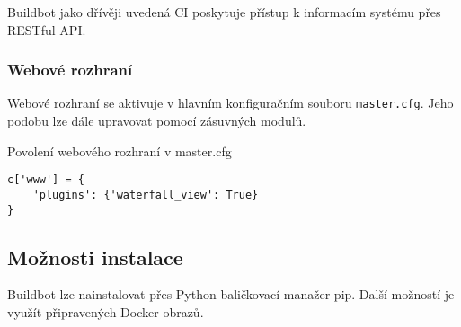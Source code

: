 Buildbot jako dřívěji uvedená CI poskytuje přístup k informacím systému přes RESTful API.

\subsubsection{Webové rozhraní}

Webové rozhraní se aktivuje v hlavním konfiguračním souboru \verb|master.cfg|.
Jeho podobu lze dále upravovat pomocí zásuvných modulů.

\begin{listing}[ht]
\caption{\label{code:buildbot-enable-web}Povolení webového rozhraní v master.cfg}
\begin{verbatim}
c['www'] = {
    'plugins': {'waterfall_view': True}
}
\end{verbatim}
\end{listing}

\subsection{Možnosti instalace}

Buildbot lze nainstalovat přes Python baličkovací manažer pip.
Další možností je využít připravených Docker obrazů.